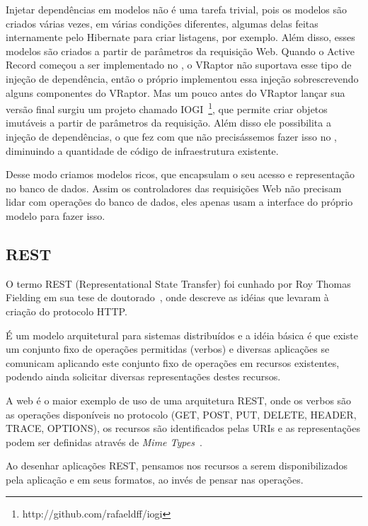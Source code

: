 Injetar dependências em modelos não é uma tarefa trivial, pois os modelos são criados várias vezes, em várias condições
diferentes, algumas delas feitas internamente pelo Hibernate para criar listagens, por exemplo. Além disso, esses
modelos são criados a partir de parâmetros da requisição Web. Quando o Active Record começou a ser implementado no 
\calopsita, o VRaptor não suportava esse tipo de injeção de dependência, então o próprio \calopsita implementou essa
injeção sobrescrevendo alguns componentes do VRaptor. Mas um pouco antes do VRaptor lançar sua versão final surgiu
um projeto \opensource chamado IOGI~\footnote{http://github.com/rafaeldff/iogi}, que permite criar objetos imutáveis 
a partir de parâmetros da requisição.
Além disso ele possibilita a injeção de dependências, o que fez com que não precisássemos fazer isso no \calopsita,
diminuindo a quantidade de código de infraestrutura existente.

Desse modo criamos modelos ricos, que encapsulam o seu acesso e representação no banco de dados. Assim os controladores
das requisições Web não precisam lidar com operações do banco de dados, eles apenas usam a interface do próprio modelo
para fazer isso.

\subsection{REST}
O termo REST (Representational State Transfer) foi cunhado por Roy Thomas Fielding em sua tese de doutorado~\cite{rest-roy}, 
onde descreve as idéias que levaram à criação do protocolo HTTP.

É um modelo arquitetural para sistemas distribuídos e a idéia básica é que existe um conjunto fixo de operações permitidas 
(verbos) e diversas aplicações se comunicam aplicando este conjunto fixo de operações em recursos existentes, podendo ainda 
solicitar diversas representações destes recursos.

A web é o maior exemplo de uso de uma arquitetura REST, onde os verbos são as operações disponíveis no protocolo (GET, POST,
PUT, DELETE, HEADER, TRACE, OPTIONS), os recursos são identificados pelas URIs e as representações podem ser definidas
através de \textit{Mime Types}~\cite{mimetypes}.

Ao desenhar aplicações REST, pensamos nos recursos a serem disponibilizados pela aplicação e em seus formatos, ao invés de
pensar nas operações.

